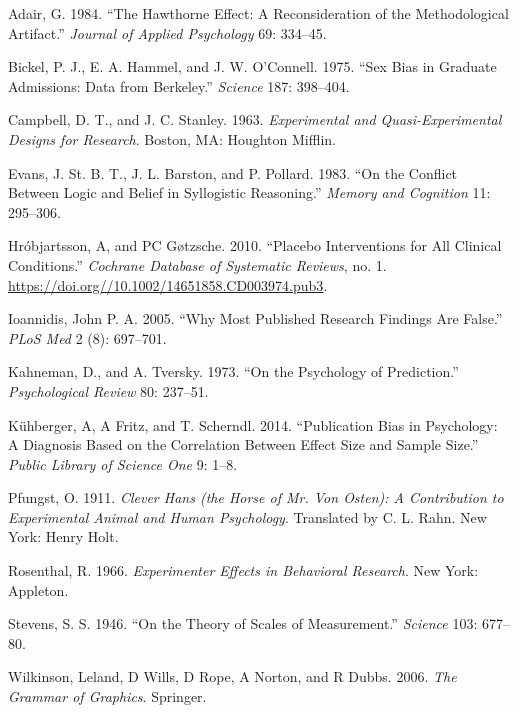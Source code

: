 \documentclass[
]{book}
\newlength{\cslhangindent}
\newlength{\cslentryspacingunit} %
\newenvironment{CSLReferences}[2] %
 {%
  \setlength{\parindent}{0pt}
  \ifodd #1
  \let\oldpar\par
  \def\par{\hangindent=\cslhangindent\oldpar}
  \fi
  \setlength{\parskip}{#2\cslentryspacingunit}
 }%
 {}
\begin{document}
\hypertarget{refs}{}
\begin{CSLReferences}{1}{0}
\leavevmode{}%
Adair, G. 1984. {``The Hawthorne Effect: A Reconsideration of the Methodological Artifact.''} \emph{Journal of Applied Psychology} 69: 334--45.

\leavevmode{}%
Bickel, P. J., E. A. Hammel, and J. W. O'Connell. 1975. {``Sex Bias in Graduate Admissions: Data from {B}erkeley.''} \emph{Science} 187: 398--404.

\leavevmode{}%
Campbell, D. T., and J. C. Stanley. 1963. \emph{Experimental and Quasi-Experimental Designs for Research}. Boston, MA: Houghton Mifflin.

\leavevmode{}%
Evans, J. St. B. T., J. L. Barston, and P. Pollard. 1983. {``On the Conflict Between Logic and Belief in Syllogistic Reasoning.''} \emph{Memory and Cognition} 11: 295--306.

\leavevmode{}%
Hróbjartsson, A, and PC Gøtzsche. 2010. {``Placebo Interventions for All Clinical Conditions.''} \emph{Cochrane Database of Systematic Reviews}, no. 1. \url{https://doi.org//10.1002/14651858.CD003974.pub3}.

\leavevmode{}%
Ioannidis, John P. A. 2005. {``Why Most Published Research Findings Are False.''} \emph{PLoS Med} 2 (8): 697--701.

\leavevmode{}%
Kahneman, D., and A. Tversky. 1973. {``On the Psychology of Prediction.''} \emph{Psychological Review} 80: 237--51.

\leavevmode{}%
Kühberger, A, A Fritz, and T. Scherndl. 2014. {``Publication Bias in Psychology: A Diagnosis Based on the Correlation Between Effect Size and Sample Size.''} \emph{Public Library of Science One} 9: 1--8.

\leavevmode{}%
Pfungst, O. 1911. \emph{Clever Hans (the Horse of Mr. Von Osten): A Contribution to Experimental Animal and Human Psychology}. Translated by C. L. Rahn. New York: Henry Holt.

\leavevmode{}%
Rosenthal, R. 1966. \emph{Experimenter Effects in Behavioral Research}. New York: Appleton.

\leavevmode{}%
Stevens, S. S. 1946. {``On the Theory of Scales of Measurement.''} \emph{Science} 103: 677--80.

\leavevmode{}%
Wilkinson, Leland, D Wills, D Rope, A Norton, and R Dubbs. 2006. \emph{The Grammar of Graphics}. Springer.

\end{CSLReferences}
\end{document}
